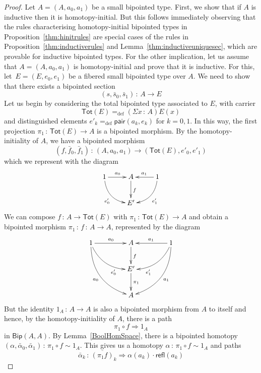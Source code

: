 \documentclass[10pt,a4paper,oneside,reqno]{amsart}
\theoremstyle{mythm}
\theoremstyle{mydef}
\theoremstyle{myrmk}
\newcommand{\defeq}{=_{\mathrm{def}}}
\newcommand{\co}{\,{:}\,}
\newcommand{\refl}{\mathsf{refl}}
\newcommand{\pair}{\mathsf{pair}}
\newcommand{\Bip}{\mathsf{Bip}}
\newcommand{\Tot}{\mathsf{Tot}}
\begin{document}
\begin{proof} Let $A = (A, a_0, a_1)$ be a small bipointed type. First, we show that if $A$ is inductive then
it is homotopy-initial. But this follows immediately observing that the rules characterising homotopy-initial bipointed types in Proposition~\ref{thm:hinitrules}
are special cases of the rules in Proposition~\ref{thm:inductiverules} and Lemma~\ref{thm:inductiveuniquesec},
which are provable for inductive bipointed types. For the other implication, 
let us assume that $A = (A, a_0, a_1)$ is homotopy-initial and prove that it is inductive. 
For this, let~$E = (E, e_0, e_1)$ be a fibered small bipointed type over $A$. We need to show that there
exists a bipointed section
\begin{equation}
\label{equ:reqsec}
(s, \bar{s}_0, \bar{s}_1) \co A \to E
\end{equation}
Let us begin by considering the total bipointed type associated to $E$, with carrier 
\[
\Tot(E) \defeq (\Sigma x \co A) E(x) 
\]
and distinguished elements $e'_k \defeq \pair(a_k, e_k)$ for $k = 0, 1$. In this way,  the first projection $\pi_1 \co 
\Tot(E) \to A$ is a bipointed morphism. By the homotopy-initiality of $A$, we have a bipointed morphism 
\[
(f, \bar{f}_0, \bar{f}_1) \co (A, a_0, a_1)  \to (\Tot(E), e'_0, e'_1) 
\]
which we represent with the diagram
\[
\xymatrix{
1 \ar@/_1pc/[dr]_{e'_0} \ar[r]^{a_0} & A  \ar[d]^f & 1 \ar[l]_{a_1} \ar@/^1pc/[dl]^{e'_1} \\
 & E' & }
 \]
 We can compose $f \co A \to \Tot(E)$ with $\pi_1 \co \Tot(E) \to A$ and obtain a bipointed morphism $\pi_1 \co f \co A \to A$, represented by the diagram
  \[
\xymatrix@C=1.5cm{
1 \ar@/_1pc/[dr]_(.7){e'_0} \ar[r]^{a_0} \ar@/_1.5pc/[ddr]_{a_0}  & A  \ar[d]^f & 1 \ar[l]_{a_1} \ar@/^1pc/[dl]^(.7){e'_1} \ar@/^1.5pc/[ddl]^{a_1}  \\
 & E' \ar[d]^{\pi_1} & \\
 & A &  }
 \]
But the identity $1_A \co A \to A$ is also a bipointed morphism from $A$ to itself and hence, by the homotopy-initiality of $A$, there is a path
\begin{equation}
\label{equ:pathcrucial}
\pi_1 \circ f \Rightarrow 1_A 
\end{equation}
in $\Bip(A,A)$. By Lemma~\ref{BoolHomSpace}, there  is a bipointed homotopy $(\alpha,
\bar{\alpha}_0,\bar{\alpha}_1) \co \pi_1 \circ f \sim 1_A$. This gives us a homotopy $\alpha \co \pi_1 \circ f \sim 1_A$ and paths
\begin{equation*}
\bar{\alpha}_k \co \overline{(\pi_1 f)}_k \Rightarrow \alpha(a_k) \cdot \refl(a_k) 

\end{equation*}
\end{proof}
\end{document}
